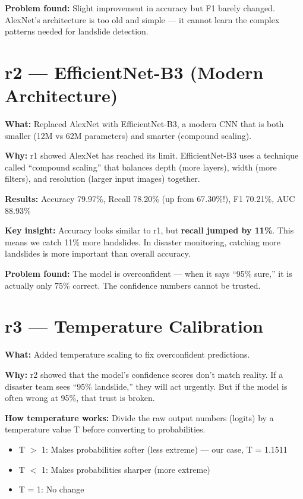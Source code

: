 \documentclass[11pt]{article}
\begin{document}
\textbf{Problem found:} Slight improvement in accuracy but F1 barely changed. AlexNet's architecture is too old and simple --- it cannot learn the complex patterns needed for landslide detection.

\section{r2 --- EfficientNet-B3 (Modern Architecture)}

\textbf{What:} Replaced AlexNet with EfficientNet-B3, a modern CNN that is both smaller (12M vs 62M parameters) and smarter (compound scaling).

\textbf{Why:} r1 showed AlexNet has reached its limit. EfficientNet-B3 uses a technique called ``compound scaling'' that balances depth (more layers), width (more filters), and resolution (larger input images) together.

\textbf{Results:} Accuracy 79.97\%, Recall 78.20\% (up from 67.30\%!), F1 70.21\%, AUC 88.93\%

\textbf{Key insight:} Accuracy looks similar to r1, but \textbf{recall jumped by 11\%}. This means we catch 11\% more landslides. In disaster monitoring, catching more landslides is more important than overall accuracy.

\textbf{Problem found:} The model is overconfident --- when it says ``95\% sure,'' it is actually only 75\% correct. The confidence numbers cannot be trusted.

\section{r3 --- Temperature Calibration}

\textbf{What:} Added temperature scaling to fix overconfident predictions.

\textbf{Why:} r2 showed that the model's confidence scores don't match reality. If a disaster team sees ``95\% landslide,'' they will act urgently. But if the model is often wrong at 95\%, that trust is broken.

\textbf{How temperature works:} Divide the raw output numbers (logits) by a temperature value T before converting to probabilities.
\begin{itemize}[noitemsep]
    \item T $>$ 1: Makes probabilities softer (less extreme) --- our case, T = 1.1511
    \item T $<$ 1: Makes probabilities sharper (more extreme)
    \item T = 1: No change
\end{itemize}
\end{document}
